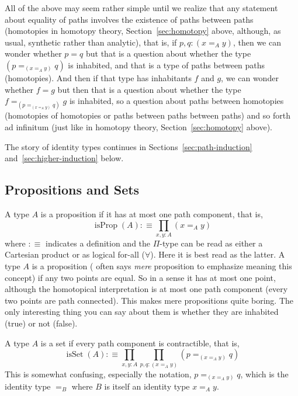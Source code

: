 \documentclass[11pt]{article}
\DeclareMathOperator{\isProp}{isProp}
\DeclareMathOperator{\isSet}{isSet}
\begin{document}
All of the above may seem rather simple until we realize that any
statement about equality of paths involves the existence of paths between
paths (homotopies in homotopy theory, Section~\ref{sec:homotopy} above,
although, as usual, synthetic rather than analytic), that is, if
$p, q : (x =_A y)$, then we can wonder whether $p = q$ but that is
a question about whether the type $(p =_{(x =_A y)} q)$ is inhabited,
and that is a type of paths between paths (homotopies).
And then if that type has inhabitants $f$ and $g$, we can wonder whether
$f = g$ but then that is a question about whether the type
$f =_{\left(p =_{(x =_A y)} q\right)} g$ is inhabited, so a question about paths
between homotopies (homotopies of homotopies
or paths between paths between paths) and so forth ad infinitum
(just like in homotopy theory, Section~\ref{sec:homotopy} above).

The story of identity types continues in Sections~\ref{sec:path-induction}
and~\ref{sec:higher-induction} below.

\subsection{Propositions and Sets}

A type $A$ is a proposition  if it
has at most one path component, that is,
\begin{equation} \label{eq:proposition}
   \isProp(A) :\equiv \prod_{x, y : A} (x =_A y)
\end{equation}
where $:\equiv$ indicates a definition and the $\Pi$-type can be read
as either a Cartesian product or as logical for-all ($\forall$).
Here it is best read as the latter.  A type $A$ is a proposition
( often says \emph{mere} proposition
to emphasize meaning this concept) if any two points are equal.
So in a sense it has at most one point, although the homotopical interpretation
is at most one path component (every two points are path connected).
This makes mere propositions quite boring.
The only interesting thing you can say
about them is whether they are inhabited (true) or not (false).

A type $A$ is a set  if every path component
is contractible, that is,
\begin{equation} \label{eq:set}
   \isSet(A) :\equiv \prod_{x, y : A} \prod_{p, q : (x =_A y)}
   (p =_{(x =_A y)} q)
\end{equation}
This is somewhat confusing, especially the notation, $p =_{(x =_A y)} q$,
which is the identity type $=_B$ where $B$ is itself an identity type
$x =_A y$.
\end{document}
